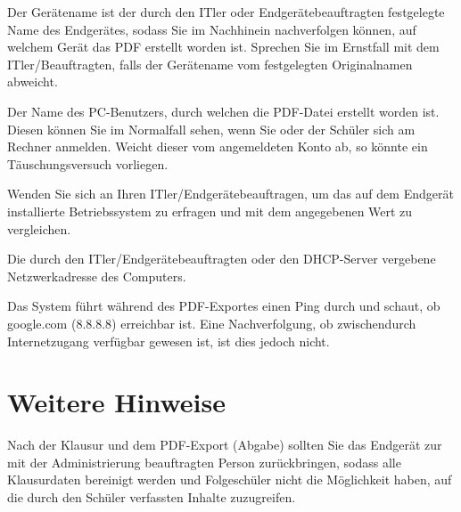 \documentclass[]{article}
\begin{document}
	\begin{tcolorbox}[note, title=Hinweis: Gerätename]
		Der Gerätename ist der durch den ITler oder Endgerätebeauftragten festgelegte Name des Endgerätes, sodass Sie im Nachhinein nachverfolgen können, auf welchem Gerät das PDF erstellt worden ist. Sprechen Sie im Ernstfall mit dem ITler/Beauftragten, falls der Gerätename vom festgelegten Originalnamen abweicht.
	\end{tcolorbox}

	\begin{tcolorbox}[note, title=Hinweis: Benutzername]
		Der Name des PC-Benutzers, durch welchen die PDF-Datei erstellt worden ist. Diesen können Sie im Normalfall sehen, wenn Sie oder der Schüler sich am Rechner anmelden. Weicht dieser vom angemeldeten Konto ab, so könnte ein Täuschungsversuch vorliegen.
	\end{tcolorbox}
	
	\begin{tcolorbox}[note, title=Hinweis: Betriebssystem]
		Wenden Sie sich an Ihren ITler/Endgerätebeauftragen, um das auf dem Endgerät installierte Betriebssystem zu erfragen und mit dem angegebenen Wert zu vergleichen.
	\end{tcolorbox}
	
	\begin{tcolorbox}[note, title=Hinweis: IP-Adresse]
		Die durch den ITler/Endgerätebeauftragten oder den DHCP-Server vergebene Netzwerkadresse des Computers.
	\end{tcolorbox}
	
	\begin{tcolorbox}[note, title=Hinweis: Internetverbindung]
		Das System führt während des PDF-Exportes einen Ping durch und schaut, ob google.com (8.8.8.8) erreichbar ist. Eine Nachverfolgung, ob zwischendurch Internetzugang verfügbar gewesen ist, ist dies jedoch nicht.
	\end{tcolorbox}

	\newpage
	\section{Weitere Hinweise}
	\begin{tcolorbox}[warning, title=Warnung: Abschluss der Klausur]
		Nach der Klausur und dem PDF-Export (Abgabe) sollten Sie das Endgerät zur mit der Administrierung beauftragten Person zurückbringen, sodass alle Klausurdaten bereinigt werden und Folgeschüler nicht die Möglichkeit haben, auf die durch den Schüler verfassten Inhalte zuzugreifen.
	\end{tcolorbox}
	
\end{document}
